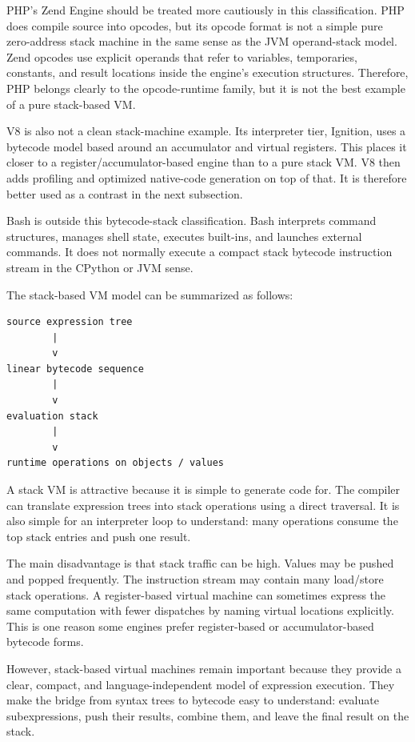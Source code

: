 \documentclass[a4paper,twoside]{report}
\begin{document}
PHP's Zend Engine should be treated more cautiously in this classification. PHP does compile source into opcodes, but its opcode format is not a simple pure zero-address stack machine in the same sense as the JVM operand-stack model. Zend opcodes use explicit operands that refer to variables, temporaries, constants, and result locations inside the engine's execution structures. Therefore, PHP belongs clearly to the opcode-runtime family, but it is not the best example of a pure stack-based VM.

V8 is also not a clean stack-machine example. Its interpreter tier, Ignition, uses a bytecode model based around an accumulator and virtual registers. This places it closer to a register/accumulator-based engine than to a pure stack VM. V8 then adds profiling and optimized native-code generation on top of that. It is therefore better used as a contrast in the next subsection.

Bash is outside this bytecode-stack classification. Bash interprets command structures, manages shell state, executes built-ins, and launches external commands. It does not normally execute a compact stack bytecode instruction stream in the CPython or JVM sense.

The stack-based VM model can be summarized as follows:

\begin{verbatim}
source expression tree
        |
        v
linear bytecode sequence
        |
        v
evaluation stack
        |
        v
runtime operations on objects / values
\end{verbatim}

A stack VM is attractive because it is simple to generate code for. The compiler can translate expression trees into stack operations using a direct traversal. It is also simple for an interpreter loop to understand: many operations consume the top stack entries and push one result.

The main disadvantage is that stack traffic can be high. Values may be pushed and popped frequently. The instruction stream may contain many load/store stack operations. A register-based virtual machine can sometimes express the same computation with fewer dispatches by naming virtual locations explicitly. This is one reason some engines prefer register-based or accumulator-based bytecode forms.

However, stack-based virtual machines remain important because they provide a clear, compact, and language-independent model of expression execution. They make the bridge from syntax trees to bytecode easy to understand: evaluate subexpressions, push their results, combine them, and leave the final result on the stack.
\end{document}
